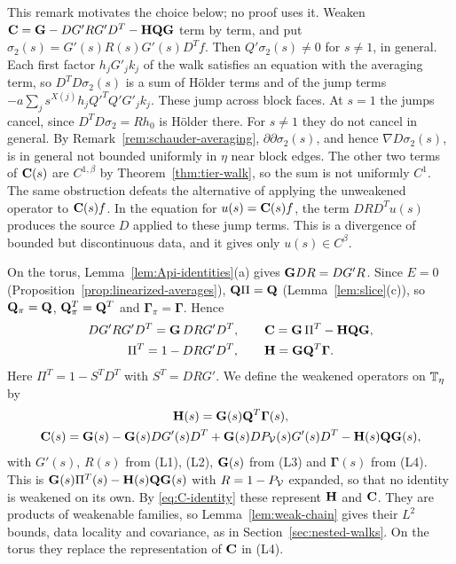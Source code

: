 \begin{remark}\label{rem:C-formula}
This remark motivates the choice below; no proof uses it. Weaken $\mathbf C=\mathbf G-DG'RG'D^T-\mathbf H\mathbf Q\mathbf G$ term by term, and put $\sigma_2(s)=G'(s)R(s)G'(s)D^Tf$. Then $Q'\sigma_2(s)\ne0$ for $s\ne1$, in general. Each first factor $h_jG'_jk_j$ of the walk satisfies an equation with the averaging term, so $D^TD\sigma_2(s)$ is a sum of H\"older terms and of the jump terms $-a\sum_js^{X(j)}h_jQ'^TQ'G'_jk_j$. These jump across block faces. At $s=1$ the jumps cancel, since $D^TD\sigma_2=Rh_0$ is H\"older there. For $s\ne1$ they do not cancel in general. By Remark~\ref{rem:schauder-averaging}, $\partial\partial\sigma_2(s)$, and hence $\nabla D\sigma_2(s)$, is in general not bounded uniformly in $\eta$ near block edges. The other two terms of $\mathbf C(s)$ are $C^{1,\beta}$ by Theorem~\ref{thm:tier-walk}, so the sum is not uniformly $C^1$. The same obstruction defeats the alternative of applying the unweakened operator to $\mathbf C(s)f$. In the equation for $u(s)=\mathbf C(s)f$, the term $DRD^Tu(s)$ produces the source $D$ applied to these jump terms. This is a divergence of bounded but discontinuous data, and it gives only $u(s)\in C^\beta$.
\end{remark}

On the torus, Lemma~\ref{lem:Api-identities}(a) gives $\mathbf G DR=DG'R$. Since $E=0$ (Proposition~\ref{prop:linearized-averages}), $\mathbf Q\Pi=\mathbf Q$ (Lemma~\ref{lem:slice}(c)), so $\mathbf Q_\pi=\mathbf Q$, $\mathbf Q_\pi^T=\mathbf Q^T$ and $\boldsymbol\Gamma_\pi=\boldsymbol\Gamma$. Hence
\begin{equation}\label{eq:C-identity}
\begin{gathered}
DG'RG'D^T=\mathbf G\,DRG'D^T,\qquad\mathbf C=\mathbf G\,\Pi^T-\mathbf H\mathbf Q\mathbf G,\\
\Pi^T=1-DRG'D^T,\qquad\mathbf H=\mathbf G\mathbf Q^T\boldsymbol\Gamma .
\end{gathered}
\end{equation}
Here $\Pi^T=1-S^TD^T$ with $S^T=DRG'$. We define the weakened operators on $\mathbb T_\eta$ by
\[
\begin{gathered}
\mathbf H(s)=\mathbf G(s)\mathbf Q^T\boldsymbol\Gamma(s),\\
\mathbf C(s)=\mathbf G(s)-\mathbf G(s)DG'(s)D^T+\mathbf G(s)DP_\mathcal V(s)G'(s)D^T-\mathbf H(s)\mathbf Q\mathbf G(s),
\end{gathered}
\]
with $G'(s)$, $R(s)$ from (L1), (L2), $\mathbf G(s)$ from (L3) and $\boldsymbol\Gamma(s)$ from (L4). This is $\mathbf G(s)\Pi^T(s)-\mathbf H(s)\mathbf Q\mathbf G(s)$ with $R=1-P_\mathcal V$ expanded, so that no identity is weakened on its own. By \eqref{eq:C-identity} these represent $\mathbf H$ and $\mathbf C$. They are products of weakenable families, so Lemma~\ref{lem:weak-chain} gives their $L^2$ bounds, data locality and covariance, as in Section~\ref{sec:nested-walks}. On the torus they replace the representation of $\mathbf C$ in (L4).

